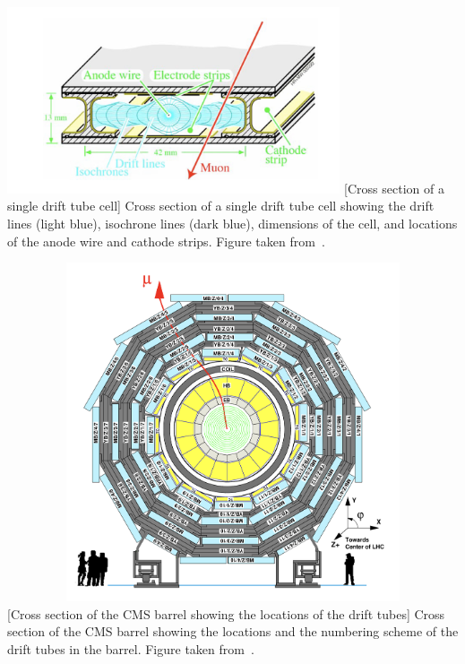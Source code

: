\begin{multiFigure}
    \centering
    \includegraphics[height=5.5cm,keepaspectratio]{figures/cms/muonsys/drifttube_xs.jpeg}
        [Cross section of a single drift tube cell]
        {Cross section of a single drift tube cell showing the drift lines (light blue), isochrone lines (dark blue), dimensions of the cell, and locations of the anode wire and cathode strips.
        Figure taken from~\cite{collaboration_cms_2008}.
        }
    \label{fig:dt_cell}
\end{multiFigure}
\begin{multiFigure}
    \centering
    \includegraphics[width=15cm,height=10cm,keepaspectratio]{figures/cms/muonsys/drifttube_locations.jpeg}
        [Cross section of the CMS barrel showing the locations of the drift tubes]
        {Cross section of the CMS barrel showing the locations and the numbering scheme of the drift tubes in the barrel.
        Figure taken from~\cite{collaboration_cms_2008}.
        }
        \label{fig:dt_locations}
\end{multiFigure}

